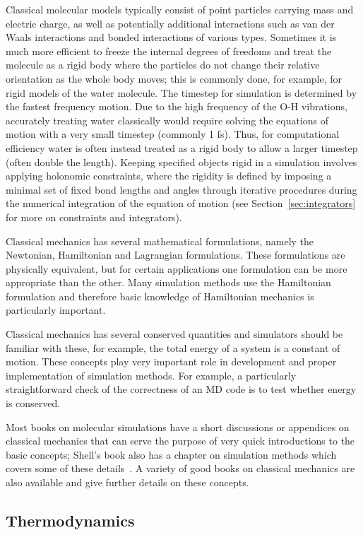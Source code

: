\documentclass[9pt,bestpractices]{livecoms}
\begin{document}
Classical molecular models typically consist of point particles carrying mass and electric charge, as well as potentially additional interactions such as van der Waals interactions and bonded interactions of various types.
Sometimes it is much more efficient to freeze the internal degrees of freedoms and treat the molecule as a rigid body where the particles do not change their relative orientation as the whole body moves; this is commonly done, for example, for rigid models of the water molecule.
The timestep for simulation is determined by the fastest frequency motion. 
Due to the high frequency of the O-H vibrations, accurately treating water classically would require solving the equations of motion with a very small timestep (commonly 1 fs). 
Thus, for computational efficiency water is often instead treated as a rigid body to allow a larger timestep (often double the length).
Keeping specified objects rigid in a simulation involves applying holonomic constraints, where the rigidity is defined by imposing a minimal set of fixed bond lengths and angles through iterative procedures during the numerical integration of the equation of motion (see Section~\ref{sec:integrators} for more on constraints and integrators).

Classical mechanics has several mathematical formulations, namely the Newtonian, Hamiltonian and Lagrangian formulations.
These formulations are physically equivalent, but for certain applications one formulation can be more appropriate than the other. 
Many simulation methods use the Hamiltonian formulation and therefore basic knowledge of Hamiltonian mechanics is particularly important.

Classical mechanics has several conserved quantities and simulators should be familiar with these, for example, the total energy of a system is a constant of motion.
These concepts play very important role in development and proper implementation of simulation methods.
For example, a particularly straightforward check of the correctness of an MD code is to test whether energy is conserved.

Most books on molecular simulations have a short discussions or appendices on classical mechanics that can serve the purpose of very quick introductions to the basic concepts; Shell's book also has a chapter on simulation methods which covers some of these details~\cite{ShellBook}.
A variety of good books on classical mechanics are also available and give further details on these concepts.

\subsection{Thermodynamics}
\label{sec:thermodynamics}
\end{document}
